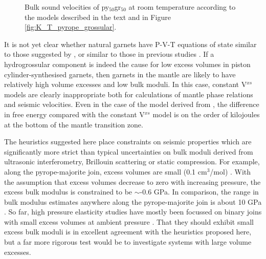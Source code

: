 \begin{figure}[ht!]
  \centering
  \caption{Bulk sound velocities of py$_{50}$gr$_{50}$ at room temperature according to the models described in the text and in Figure \ref{fig:K_T_pyrope_grossular}.}
  \label{fig:bulk_sound_garnet}
\end{figure}

It is not yet clear whether natural garnets have P-V-T equations of state similar to those suggested by \cite{DCW2015}, or similar to those in previous studies \citep{NCK1977, BG1997, GCT1996}. If a hydrogrossular component is indeed the cause for low excess volumes in piston cylinder-synthesised garnets, then garnets in the mantle are likely to have relatively high volume excesses and low bulk moduli. In this case, constant V$^{xs}$ models are clearly inappropriate both for calculations of mantle phase relations and seismic velocities. Even in the case of the model derived from \cite{GCT1996}, the difference in free energy compared with the constant V$^{xs}$ model is on the order of kilojoules at the bottom of the mantle transition zone. 

The heuristics suggested here place constraints on seismic properties which are significantly more strict than typical uncertainties on bulk moduli derived from ultrasonic interferometry, Brillouin scattering or static compression. For example, along the pyrope-majorite join, excess volumes are small (0.1 cm$^3$/mol) \citep{HSSR1997}. With the assumption that excess volumes decrease to zero with increasing pressure, the excess bulk modulus is constrained to be $\sim$-0.6 GPa. In comparison, the range in bulk modulus estimates anywhere along the pyrope-majorite join is about 10 GPa \citep[see, for example][]{HDLWB2010}. So far, high pressure elasticity studies have mostly been focussed on binary joins with small excess volumes at ambient pressure \citep{FXMLX2015, HC2014}. That they should exhibit small excess bulk moduli is in excellent agreement with the heuristics proposed here, but a far more rigorous test would be to investigate systems with large volume excesses.

